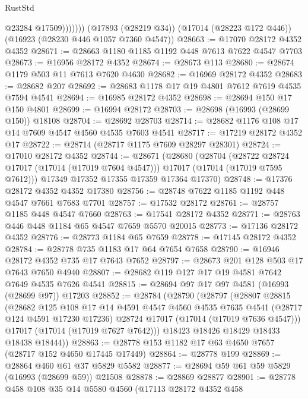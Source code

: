 \begin{lexlean}{RustStd}
\begin{coremodule}
{\begin{coremodule}
{{{{{{{{{{{{{{{{{{{{{{{{{{{{{{{{{{{{{{{{{{{{{{{{{{{{{{{                  @23284
                  @17509)))))))
    (@17893 (@28219 @34))
    (@17014 (@28223 @172 @446))
    (@16923 (@28230 @446 @1057 @7360 @4547))
@28663 := @17070 @28172 @4352 @4352
@28671 := @28663 @1180 @1185 @1192 @448 @7613 @7622 @4547 @7703
@28673 := @16956 @28172 @4352
@28674 := @28673 @113
@28680 := @28674 @1179 @503 @11 @7613 @7620 @4630
@28682 := @16969 @28172 @4352
@28683 := @28682 @207
@28692 := @28683 @1178 @17 @19 @4801 @7612 @7619 @4535 @7594 @4541
@28694 := @16985 @28172 @4352
@28698 := @28694 @150 @17 @150 @4801
@28699 := @16994 @28172
@28703 := @28698 (@16993 (@28699 @150)) @18108
@28704 := @28692 @28703
@28714 := @28682 @1176 @108 @17 @14 @7609 @4547 @4560 @4535 @7603 @4541
@28717 := @17219 @28172 @4352 @17
@28722 := @28714 (@28717 @1175 @7609 @28297 @28301)
@28724 := @17010 @28172 @4352
@28744 := @28671
    (@28680
      (@28704
        (@28722 @28724 @17017 (@17014 (@17019 @7604 @4547)))
        @17017
        (@17014 (@17019 @7595 @7612)))
      @17349
      @17352
      @17355
      @17359
      @17364
      @17370)
@28748 := @17376 @28172 @4352 @4352 @17380
@28756 := @28748 @7622 @1185 @1192 @448 @4547 @7661 @7683 @7701
@28757 := @17532 @28172
@28761 := @28757 @1185 @448 @4547 @7660
@28763 := @17541 @28172 @4352
@28771 := @28763 @446 @448 @1184 @65 @4547 @7659 @5570 @20015
@28773 := @17136 @28172 @4352
@28776 := @28773 @1184 @65 @7659
@28778 := @17145 @28172 @4352
@28784 := @28778 @735 @1183 @17 @64 @7654 @7658
@28790 := @16946 @28172 @4352 @735 @17 @7643 @7652
@28797 := @28673 @201 @128 @503 @17 @7643 @7650 @4940
@28807 := @28682 @119 @127 @17 @19 @4581 @7642 @7649 @4535 @7626 @4541
@28815 := @28694 @97 @17 @97 @4581 (@16993 (@28699 @97)) @17203
@28852 := @28784
    (@28790
      (@28797
        (@28807
          @28815
          (@28682
            @125
            @108
            @17
            @14
            @4591
            @4547
            @4560
            @4535
            @7635
            @4541
            (@28717 @124 @4591 @17230 @17236)
            @28724
            @17017
            (@17014 (@17019 @7636 @4547)))
          @17017
          (@17014 (@17019 @7627 @7642)))
        @18423
        @18426
        @18429
        @18433
        @18438
        @18444))
@28863 := @28778 @153 @1182 @17 @63 @4650 @7657 (@28717 @152 @4650 @17445 @17449)
@28864 := @28778 @199
@28869 := @28864 @460 @61 @37 @5829 @5582
@28877 := @28694 @59 @61 @59 @5829 (@16993 (@28699 @59)) @21508
@28878 := @28869 @28877
@28901 := @28778
    @458
    @108
    @35
    @14
    @5580
    @4560
    (@17113
      @28172
      @4352
      @458
}}}}}}}}}}}}}}}}}}}}}}}}}}}}}}}}}}}}}}}}}}}}}}}}}}}}}}}
\end{coremodule}}
\end{coremodule}
\end{lexlean}
